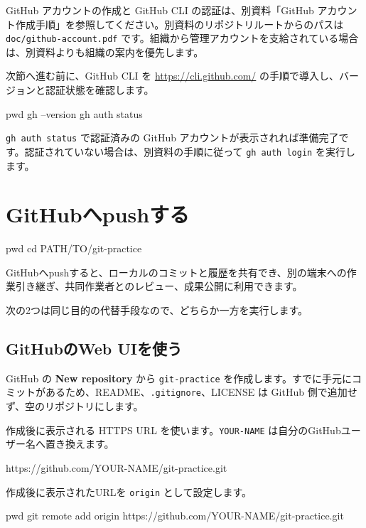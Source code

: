 \documentclass[a4paper,11pt]{jlreq}
\newcommand{\cmd}[1]{\texttt{#1}}
\newcommand{\term}[1]{\textbf{#1}}
\begin{document}
GitHub アカウントの作成と GitHub CLI の認証は、別資料「GitHub アカウント作成手順」を参照してください。別資料のリポジトリルートからのパスは \cmd{doc/github-account.pdf} です。組織から管理アカウントを支給されている場合は、別資料よりも組織の案内を優先します。

次節へ進む前に、GitHub CLI を \url{https://cli.github.com/} の手順で導入し、バージョンと認証状態を確認します。

\begin{codeblock}
pwd
gh --version
gh auth status
\end{codeblock}

\cmd{gh auth status} で認証済みの GitHub アカウントが表示されれば準備完了です。認証されていない場合は、別資料の手順に従って \cmd{gh auth login} を実行します。

\section{GitHubへpushする}

\begin{codeblock}
pwd
cd PATH/TO/git-practice
\end{codeblock}

GitHubへpushすると、ローカルのコミットと履歴を共有でき、別の端末への作業引き継ぎ、共同作業者とのレビュー、成果公開に利用できます。

次の2つは同じ目的の代替手段なので、どちらか一方を実行します。

\subsection{GitHubのWeb UIを使う}

GitHub の \term{New repository} から \cmd{git-practice} を作成します。すでに手元にコミットがあるため、README、\cmd{.gitignore}、LICENSE は GitHub 側で追加せず、空のリポジトリにします。

作成後に表示される HTTPS URL を使います。\cmd{YOUR-NAME} は自分のGitHubユーザー名へ置き換えます。

\begin{codeblock}
https://github.com/YOUR-NAME/git-practice.git
\end{codeblock}

作成後に表示されたURLを \cmd{origin} として設定します。

\begin{codeblock}
pwd
git remote add origin https://github.com/YOUR-NAME/git-practice.git
\end{codeblock}
\end{document}
